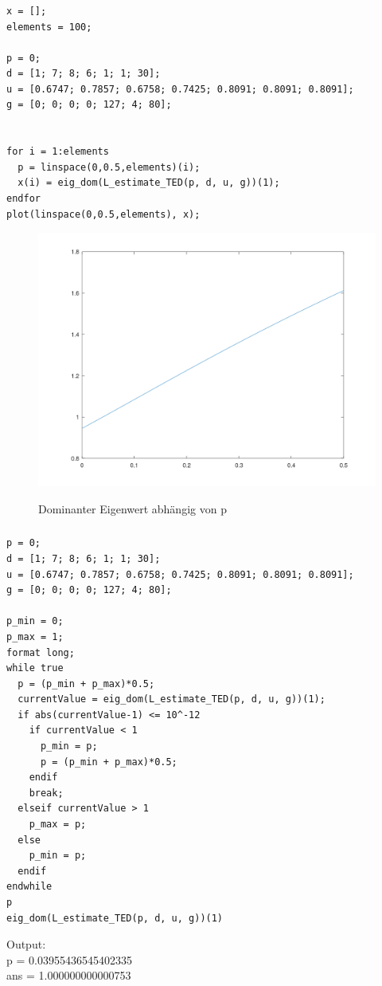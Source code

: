 \documentclass{article}
\begin{document}
\normalsize

\subsubsection{}
\begin{lstlisting}
x = [];
elements = 100;

p = 0;
d = [1; 7; 8; 6; 1; 1; 30];
u = [0.6747; 0.7857; 0.6758; 0.7425; 0.8091; 0.8091; 0.8091];
g = [0; 0; 0; 0; 127; 4; 80];


for i = 1:elements
  p = linspace(0,0.5,elements)(i);
  x(i) = eig_dom(L_estimate_TED(p, d, u, g))(1);
endfor
plot(linspace(0,0.5,elements), x);
\end{lstlisting}

\begin{figure}[H]
\centering
\includegraphics[scale=0.3]{dom_eig_abh_p_KARETT.png}
\label{fig:universe}
\caption{Dominanter Eigenwert abhängig von p}
\end{figure}

\subsubsection{}
\begin{lstlisting}
p = 0;
d = [1; 7; 8; 6; 1; 1; 30];
u = [0.6747; 0.7857; 0.6758; 0.7425; 0.8091; 0.8091; 0.8091];
g = [0; 0; 0; 0; 127; 4; 80];

p_min = 0;
p_max = 1;
format long;
while true
  p = (p_min + p_max)*0.5;
  currentValue = eig_dom(L_estimate_TED(p, d, u, g))(1);
  if abs(currentValue-1) <= 10^-12
    if currentValue < 1
      p_min = p;
      p = (p_min + p_max)*0.5;
    endif
    break;
  elseif currentValue > 1
    p_max = p;
  else
    p_min = p;
  endif
endwhile
p
eig_dom(L_estimate_TED(p, d, u, g))(1)
\end{lstlisting}
Output: \\
    p = 0.03955436545402335 \\
    ans = 1.000000000000753
\end{document}

